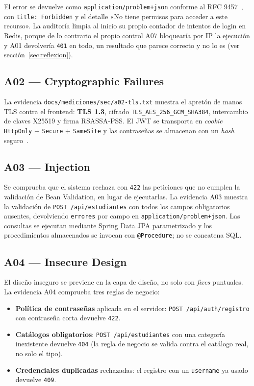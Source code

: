 \documentclass[11pt,a4paper]{article}
\newcommand{\ruta}[1]{\texttt{\footnotesize #1}}
\begin{document}
El error se devuelve como \texttt{application/problem+json} conforme al RFC
9457~\cite{rfc9457}, con \texttt{title: Forbidden} y el detalle «No tiene
permisos para acceder a este recurso». La auditoría limpia al inicio su
propio contador de intentos de login en Redis, porque de lo contrario el
propio control A07 bloquearía por IP la ejecución y A01 devolvería \texttt{401}
en todo, un resultado que parece correcto y no lo es (ver
sección~\ref{sec:reflexion}).

\subsection{A02 --- Cryptographic Failures}

La evidencia \ruta{docs/mediciones/sec/a02-tls.txt} muestra el apretón de
manos TLS contra el frontend: \textbf{TLS 1.3}, cifrado
\texttt{TLS\_AES\_256\_GCM\_SHA384}, intercambio de claves X25519 y firma
RSASSA-PSS. El JWT se transporta en \emph{cookie} \texttt{HttpOnly} +
\texttt{Secure} + \texttt{SameSite} y las contraseñas se almacenan con un
\emph{hash} seguro~\cite{rfc7519}.

\subsection{A03 --- Injection}

Se comprueba que el sistema rechaza con \texttt{422} las peticiones que no
cumplen la validación de Bean Validation, en lugar de ejecutarlas. La
evidencia A03 muestra la validación de \texttt{POST /api/estudiantes} con
todos los campos obligatorios ausentes, devolviendo \texttt{errores} por
campo en \texttt{application/problem+json}. Las consultas se ejecutan
mediante Spring Data JPA parametrizado y los procedimientos almacenados se
invocan con \texttt{@Procedure}; no se concatena SQL.

\subsection{A04 --- Insecure Design}

El diseño inseguro se previene en la capa de diseño, no solo con \emph{fixes}
puntuales. La evidencia A04 comprueba tres reglas de negocio:

\begin{itemize}[leftmargin=*]
  \item \textbf{Política de contraseñas} aplicada en el servidor:
    \texttt{POST /api/auth/registro} con contraseña corta devuelve
    \texttt{422}.
  \item \textbf{Catálogos obligatorios}: \texttt{POST /api/estudiantes} con
    una categoría inexistente devuelve \texttt{404} (la regla de negocio se
    valida contra el catálogo real, no solo el tipo).
  \item \textbf{Credenciales duplicadas} rechazadas: el registro con un
    \texttt{username} ya usado devuelve \texttt{409}.
\end{itemize}
\end{document}

